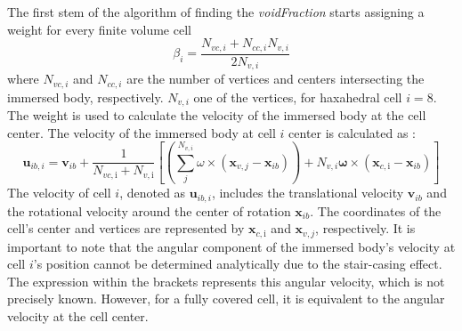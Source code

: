 The first stem of the algorithm of finding the \textit{voidFraction} starts assigning a weight for every finite volume cell 
\begin{equation}
\beta_{i}=\frac{N_{v c, i}+N_{c c, i} N_{v, i}}{2 N_{v, i}}
\end{equation}
where $N_{v c, i}$ and $N_{c c, i} $ are the number of vertices and centers intersecting the immersed body, respectively. $N_{v, i}$ one of the vertices, for haxahedral cell $i = 8$. The weight is used to calculate the velocity of the immersed body at the cell center. The velocity of the immersed body at cell $i$ center is calculated as \cite{blais2016semi}:
\begin{equation} \label{IB_forces}
    \boldsymbol{u}_{i b, i} = \boldsymbol{v}_{i b}+\frac{1}{N_{v c, \mathrm{i}}+N_{v, \mathrm{i}}}\left[\left(\sum_{j}^{N_{v, i}} \omega \times\left(\boldsymbol{x}_{v, j}-\boldsymbol{x}_{i b}\right)\right)+N_{v, i} \boldsymbol{\omega} \times\left(\boldsymbol{x}_{c, \mathrm{i}}-\boldsymbol{x}_{i b}\right)\right]
\end{equation}
The velocity of cell $i$, denoted as $\boldsymbol{u}_{ib, i}$, includes the translational velocity $\boldsymbol{v}_{ib}$ and the rotational velocity around the center of rotation $\boldsymbol{x}_{ib}$. The coordinates of the cell's center and vertices are represented by $\boldsymbol{x}_{c, \mathrm{i}}$ and $\boldsymbol{x}_{v, j}$, respectively. It is important to note that the angular component of the immersed body's velocity at cell $i$'s position cannot be determined analytically due to the stair-casing effect. The expression within the brackets represents this angular velocity, which is not precisely known.
However, for a fully covered cell, it is equivalent to the angular velocity at the cell center.
